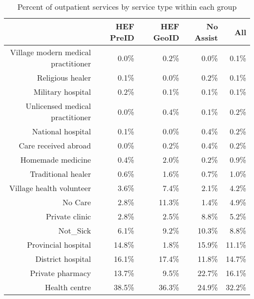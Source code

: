 \begin{table}[ht]
\centering
\begin{tabular}{rrrrr}
  \hline
 & HEF PreID & HEF GeoID & No Assist & All \\ 
  \hline
Village modern medical practitioner & 0.0\% & 0.2\% & 0.0\% & 0.1\% \\ 
  Religious healer & 0.1\% & 0.0\% & 0.2\% & 0.1\% \\ 
  Military hospital & 0.2\% & 0.1\% & 0.1\% & 0.1\% \\ 
  Unlicensed medical practitioner & 0.0\% & 0.4\% & 0.1\% & 0.2\% \\ 
  National hospital & 0.1\% & 0.0\% & 0.4\% & 0.2\% \\ 
  Care received abroad & 0.0\% & 0.2\% & 0.4\% & 0.2\% \\ 
  Homemade medicine & 0.4\% & 2.0\% & 0.2\% & 0.9\% \\ 
  Traditional healer & 0.6\% & 1.6\% & 0.7\% & 1.0\% \\ 
  Village health volunteer & 3.6\% & 7.4\% & 2.1\% & 4.2\% \\ 
  No Care & 2.8\% & 11.3\% & 1.4\% & 4.9\% \\ 
  Private clinic & 2.8\% & 2.5\% & 8.8\% & 5.2\% \\ 
  Not\_Sick & 6.1\% & 9.2\% & 10.3\% & 8.8\% \\ 
  Provincial hospital & 14.8\% & 1.8\% & 15.9\% & 11.1\% \\ 
  District hospital & 16.1\% & 17.4\% & 11.8\% & 14.7\% \\ 
  Private pharmacy & 13.7\% & 9.5\% & 22.7\% & 16.1\% \\ 
  Health centre & 38.5\% & 36.3\% & 24.9\% & 32.2\% \\ 
   \hline
\end{tabular}
\caption{Percent of outpatient services by service type within each group} 
\end{table}
